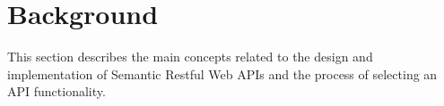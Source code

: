 \section{Background} \label{sec:background}




This section describes the main concepts related to the design and implementation of Semantic Restful Web APIs and the process of selecting an API functionality.





